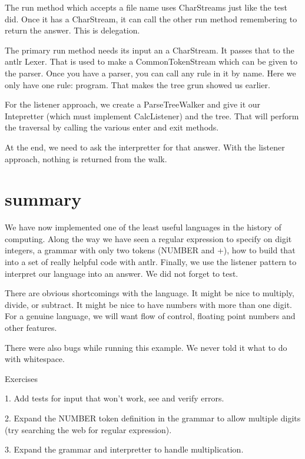 The run method which accepts a file name uses CharStreams just like
the test did. Once it has a CharStream, it can call the other run
method remembering to return the answer. This is delegation.

The primary run method needs its input an a CharStream. It passes
that to the antlr Lexer. That is used to make a CommonTokenStream
which can be given to the parser. Once you have a parser, you can
call any rule in it by name. Here we only have one rule: program.
That makes the tree grun showed us earlier.

For the listener approach, we create a ParseTreeWalker and give it
our Intepretter (which must implement CalcListener) and the tree.
That will perform the traversal by calling the various enter and
exit methods.

At the end, we need to ask the interpretter for that answer. With
the listener approach, nothing is returned from the walk.

\section{summary}

We have now implemented one of the least useful languages in the
history of computing. Along the way we have seen a regular
expression to specify on digit integers, a grammar with only
two tokens (NUMBER and +), how to build that into a set of
really helpful code with antlr. Finally, we use the listener
pattern to interpret our language into an answer. We did not
forget to test.

There are obvious shortcomings with the language. It might be nice
to multiply, divide, or subtract. It might be nice to have numbers
with more than one digit. For a genuine language, we will want
flow of control, floating point numbers and other features.

There were also bugs while running this example. We never told
it what to do with whitespace.

Exercises

1. Add tests for input that won't work, see and verify errors.

2. Expand the NUMBER token definition in the grammar to allow
   multiple digits (try searching the web for regular expression).

3. Expand the grammar and interpretter to handle multiplication.
